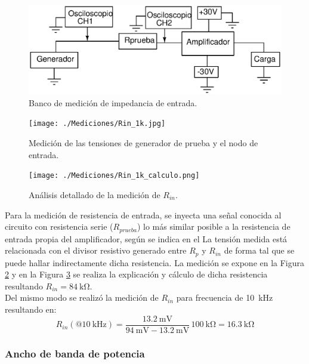 		\begin{figure}[ H]
			\centering
			\includegraphics[scale=0.6]{./Figuras/bco_zo.eps}
			\caption{Banco de medición de impedancia de entrada.}
			\label{fig:rin_bco_med}
		\end{figure}
			
		\begin{figure}[ H]
			\centering
			\texttt{[image: ./Mediciones/Rin\_1k.jpg]}
			\caption{Medición de las tensiones de generador de prueba y el nodo de entrada.}
			\label{fig:rin_med}
		\end{figure}

		\begin{figure}[ H]
			\centering
			\texttt{[image: ./Mediciones/Rin\_1k\_calculo.png]}
			\caption{Análisis detallado de la medición de $R_{in}$.}
			\label{fig:analisis_rin_med}
		\end{figure}

		Para la medición de resistencia de entrada, se inyecta una señal conocida al circuito con resistencia serie ($R_{prueba}$) lo más similar posible a la resistencia de entrada propia del amplificador, según se indica en el La tensión medida está relacionada con el divisor resistivo generado entre $R_{p}$ y $R_{in}$ de forma tal que se puede hallar indirectamente dicha resistencia. La medición se expone en la Figura \ref{fig:rin_med} y en la Figura \ref{fig:analisis_rin_med} se realiza la explicación y cálculo de dicha resistencia resultando $\boxed{R_{in}=\SI{84}{\kilo\ohm}}$.\\

		Del mismo modo se realizó la medición de $R_{in}$ para frecuencia de \SI{10}{\kHz} resultando en:
		\begin{equation*}
			R_{in}(@\SI{10}{\kHz})  = \frac{\SI{13.2}{\mV}}{\SI{94}{\mV} - \SI{13.2}{\mV}} \, \SI{100}{\kilo\ohm} = \boxed{\SI{16.3}{\kilo\ohm}}
		\end{equation*}
		\subsubsection{Ancho de banda de potencia}

